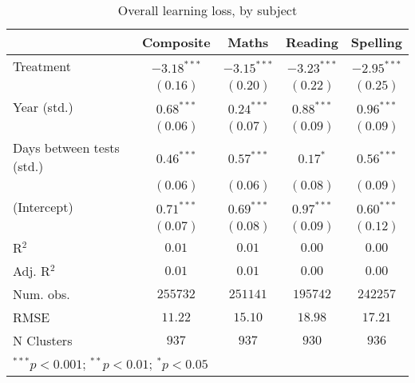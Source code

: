 
\begin{table}
\begin{center}
\begin{tabular}{l c c c c}
\hline
 & Composite & Maths & Reading & Spelling \\
\hline
Treatment                 & $-3.18^{***}$ & $-3.15^{***}$ & $-3.23^{***}$ & $-2.95^{***}$ \\
                          & $(0.16)$      & $(0.20)$      & $(0.22)$      & $(0.25)$      \\
Year (std.)               & $0.68^{***}$  & $0.24^{***}$  & $0.88^{***}$  & $0.96^{***}$  \\
                          & $(0.06)$      & $(0.07)$      & $(0.09)$      & $(0.09)$      \\
Days between tests (std.) & $0.46^{***}$  & $0.57^{***}$  & $0.17^{*}$    & $0.56^{***}$  \\
                          & $(0.06)$      & $(0.06)$      & $(0.08)$      & $(0.09)$      \\
(Intercept)               & $0.71^{***}$  & $0.69^{***}$  & $0.97^{***}$  & $0.60^{***}$  \\
                          & $(0.07)$      & $(0.08)$      & $(0.09)$      & $(0.12)$      \\
\hline
R$^2$                     & $0.01$        & $0.01$        & $0.00$        & $0.00$        \\
Adj. R$^2$                & $0.01$        & $0.01$        & $0.00$        & $0.00$        \\
Num. obs.                 & $255732$      & $251141$      & $195742$      & $242257$      \\
RMSE                      & $11.22$       & $15.10$       & $18.98$       & $17.21$       \\
N Clusters                & $937$         & $937$         & $930$         & $936$         \\
\hline
\multicolumn{5}{l}{\scriptsize{$^{***}p<0.001$; $^{**}p<0.01$; $^{*}p<0.05$}}
\end{tabular}
\caption{Overall learning loss, by subject}
\label{table:overall}
\end{center}
\end{table}

